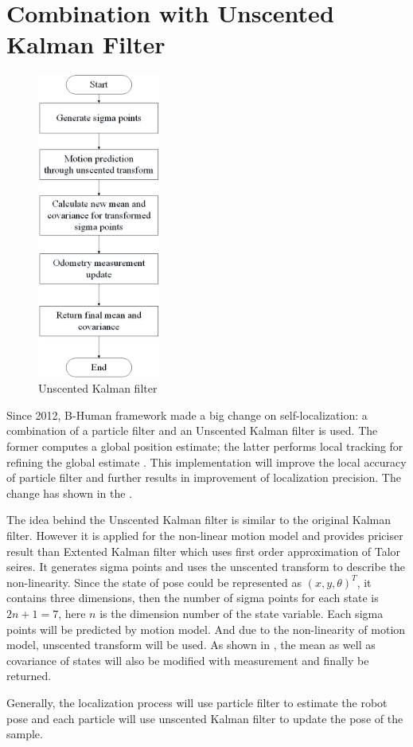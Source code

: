 \section{Combination with Unscented Kalman Filter}
\begin{figure}[!htb]
    \includegraphics[width=0.36\textwidth]{pics/ukf.jpg}
    \centering
    \caption{Unscented Kalman filter}
    \label{fig: ukf}
\end{figure}
Since 2012, B-Human framework made a big change on self-localization: a combination of a particle filter and an Unscented Kalman filter is used.
The former computes a global position estimate; the latter performs local tracking for refining the global estimate \cite{BHumanCodeRelease2012}. 
This implementation will improve the local accuracy of particle filter and further results in improvement of localization precision. The change has shown in the  . 

The idea behind the Unscented Kalman filter is similar to the original Kalman filter. However it is applied for the non-linear motion model and provides priciser result than Extented Kalman filter which uses first order approximation of Talor seires. It generates sigma points and uses the unscented transform to describe the non-linearity. Since the state of pose could be represented as $(x,y,\theta)^T$, it contains three dimensions, then the number of sigma points for each state is $2n+1=7$, here $n$ is the dimension number of the state variable. Each sigma points will be predicted by motion model. And due to the non-linearity of motion model, unscented transform will be used.  As shown in , the mean as well as covariance of states will also be modified with measurement and finally be returned. 

Generally, the localization process will use particle filter to estimate the robot pose and each particle will use unscented Kalman filter to update the pose of the sample.
